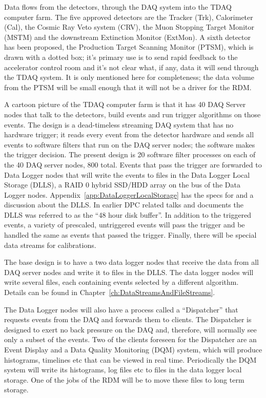 Data flows from the detectors, through the DAQ system into the TDAQ computer farm.
The five approved detectors are the Tracker (Trk), Calorimeter (Cal), the Cosmic Ray Veto system (CRV),
the Muon Stopping Target Monitor (MSTM) and the downstream Extinction Monitor (ExtMon).
A sixth detector has been proposed, the Production Target Scanning Monitor (PTSM),
which is drawn with a dotted box;
it's primary use is to send rapid feedback to the accelerator control room
and it's not clear what, if any, data it will send through the TDAQ system.
It is only mentioned here for completeness;
the data volume from the PTSM will be small enough that it will not be
a driver for the RDM.

A cartoon picture of the TDAQ computer farm is that it has 40 DAQ Server nodes
that talk to the detectors, build events and run trigger algorithms on those events.
The design is a dead-timeless streaming DAQ system that has no hardware trigger;
it reads every event from the detector hardware and sends all events to software filters
that run on the DAQ server nodes;
the software makes the trigger decision.
The present design is 20 software filter processes on each of the 40 DAQ server nodes, 800 total.
Events that pass the trigger are forwarded to Data Logger nodes that will write the events
to files in the Data Logger Local Storage (DLLS), a RAID 0 hybrid SSD/HDD array on the bus of the Data Logger nodes.
Appendix~\ref{app:DataLoggerLocalStorage} has the specs for and a discussion about the DLLS.
In earlier DPC related talks and documents the DLLS  was referred to as the ``48 hour disk buffer''.
In addition to the triggered events, a variety of prescaled, untriggered events will pass the
trigger and be handled the same as events that passed the trigger.
Finally, there will be special data streams for calibrations.

The base design is to have a two data logger nodes that receive the data from all DAQ server nodes
and write it to files in the DLLS.
The data logger nodes will write several files, each containing events selected by a different algorithm.
Details can be found in Chapter~\ref{ch:DataStreamsAndFileStreams}.

The Data Logger nodes will also have a process called a ``Dispatcher''
that requests events from the DAQ and forwards them to clients.
The Dispatcher is designed to exert no back pressure on the DAQ
and, therefore, will normally see only a subset of the events.
Two of the clients foreseen for the Dispatcher are an Event Display and
a Data Quality Monitoring (DQM) system,
which will produce histograms, timelines etc that can be viewed in real time.
Periodically the DQM system will write its histograms, log files etc to
files in the data logger local storage.  One of the jobs of the RDM will be
to move these files to long term storage.

